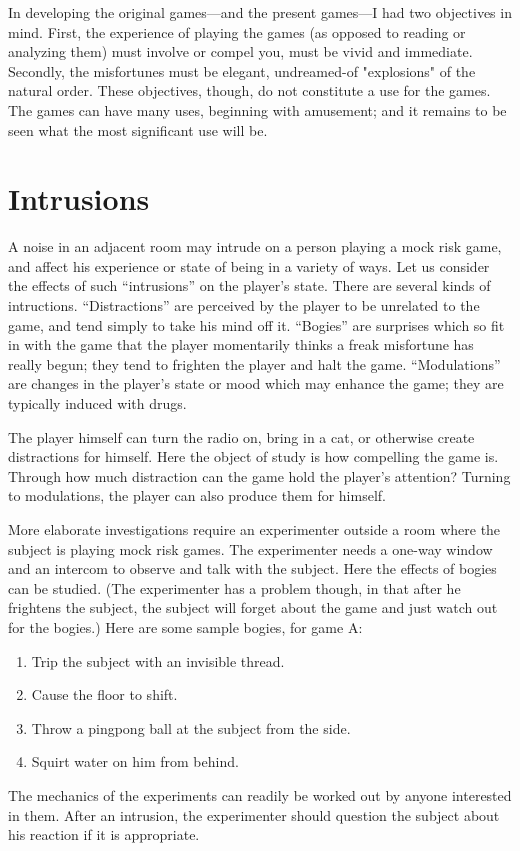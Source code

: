 In developing the original games---and the present games---I had two
objectives in mind. First, the experience of playing the games (as opposed to
reading or analyzing them) must involve or compel you, must be vivid and
immediate. Secondly, the misfortunes must be elegant, undreamed-of
"explosions" of the natural order. These objectives, though, do not
constitute a use for the games. The games can have many uses, beginning
with amusement; and it remains to be seen what the most significant use will
be.

\section*{Intrusions}

A noise in an adjacent room may intrude on a person playing a mock
risk game, and affect his experience or state of being in a variety of ways.
Let us consider the effects of such \enquote{intrusions} on the player's state. There
are several kinds of intructions. \enquote{Distractions} are perceived by the player to
be unrelated to the game, and tend simply to take his mind off it. \enquote{Bogies}
are surprises which so fit in with the game that the player momentarily
thinks a freak misfortune has really begun; they tend to frighten the player 
and halt the game. \enquote{Modulations} are changes in the player's state or mood
which may enhance the game; they are typically induced with drugs.

The player himself can turn the radio on, bring in a cat, or otherwise
create distractions for himself. Here the object of study is how compelling
the game is. Through how much distraction can the game hold the player's 
attention? Turning to modulations, the player can also produce them for
himself.

More elaborate investigations require an experimenter outside a room
where the subject is playing mock risk games. The experimenter needs a
one-way window and an intercom to observe and talk with the subject. Here
the effects of bogies can be studied. (The experimenter has a problem 
though, in that after he frightens the subject, the subject will forget about
the game and just watch out for the bogies.) Here are some sample bogies,
for game A:
\begin{enumerate}
	\item Trip the subject with an invisible thread.
	\item Cause the floor to shift.
	\item Throw a pingpong ball at the subject from the side.
	\item Squirt water on him from behind.
\end{enumerate}
The mechanics of the experiments can readily be 
worked out by anyone interested in them. After an intrusion, the 
experimenter should question the subject about his reaction if it is
appropriate.

